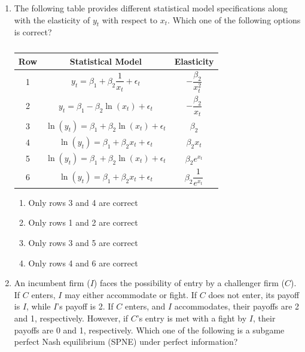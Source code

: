 \documentclass{article}
\begin{document}
\begin{enumerate}[leftmargin=*, start=45, label=Q.\arabic*.]
    \item The following table provides different statistical model specifications along with the elasticity of $y_t$ with respect to $x_t$. Which one of the following options is correct?

    \begin{table}[h]
        \centering
        \begin{tabular}{|c|c|c|}
        \hline
            Row & Statistical Model & Elasticity \\ \hline
            1 & $y_t=\beta_1+\beta_2\dfrac{1}{x_t}+\epsilon_t$ & $-\dfrac{\beta_2}{x^2_t}$ \\ \hline
            2 & $y_t=\beta_1-\beta_2\ln{(x_t)}+\epsilon_t$ & $-\dfrac{\beta_2}{x_t}$ \\ \hline
            3 & $\ln{(y_t)}=\beta_1+\beta_2\ln{(x_t)}+\epsilon_t$ & $\beta_2$ \\ \hline
            4 & $\ln{(y_t)}=\beta_1+\beta_2x_t+\epsilon_t$ & $\beta_2x_t$ \\ \hline
            5 & $\ln{(y_t)}=\beta_1+\beta_2\ln{(x_t)}+\epsilon_t$ & $\beta_2e^{x_t}$ \\ \hline
            6 & $\ln{(y_t)}=\beta_1+\beta_2x_t+\epsilon_t$ & $\beta_2\dfrac{1}{e^{x_t}}$ \\ \hline
        \end{tabular}
        \caption{}
    \end{table}

    \begin{multicols}{2}
    \begin{enumerate}
        \item Only rows 3 and 4 are correct
        \item Only rows 1 and 2 are correct
        \item Only rows 3 and 5 are correct
        \item Only rows 4 and 6 are correct
    \end{enumerate}
    \end{multicols}

    \item An incumbent firm ($I$) faces the possibility of entry by a challenger firm ($C$). If $C$ enters, $I$ may either accommodate or fight. If $C$ does not enter, its payoff is $I$, while $I$’s payoff is 2. If $C$ enters, and $I$ accommodates, their payoffs are 2 and 1, respectively. However, if $C$’s entry is met with a fight by $I$, their payoffs are 0 and 1, respectively. Which one of the following is a subgame perfect Nash equilibrium (SPNE) under perfect information?


\end{enumerate}
\end{document}
